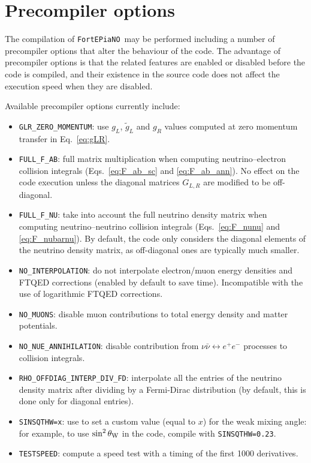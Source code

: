 \documentclass[notitlepage,nofootinbib,showpacs,preprintnumbers,amsmath,amssymb,superscriptaddress,prd,onecolumn]{revtex4-1}
\newcommand{\fortepiano}{\texttt{FortEPiaNO}}
\begin{document}
\section{Precompiler options}
\label{ssec:precompiler}
The compilation of \fortepiano\ may be performed including a number of precompiler options
that alter the behaviour of the code.
The advantage of precompiler options is that the related features are enabled or disabled
before the code is compiled, and their existence in the source code
does not affect the execution speed when they are disabled.

Available precompiler options currently include:
\begin{itemize}
\item \texttt{GLR\_ZERO\_MOMENTUM}: use $g_L$, $\tilde g_L$ and $g_R$ values
computed at zero momentum transfer \cite{Erler:2013xha} in Eq.~\eqref{eq:gLR}.
\item \texttt{FULL\_F\_AB}: full matrix multiplication
when computing neutrino--electron collision integrals
(Eqs.~\eqref{eq:F_ab_sc} and \eqref{eq:F_ab_ann}).
No effect on the code execution unless the diagonal matrices $G_{L,R}$ are modified to be off-diagonal.
\item \texttt{FULL\_F\_NU}: take into account the full neutrino density matrix
when computing neutrino--neutrino collision integrals
(Eqs.~\eqref{eq:F_nunu} and \eqref{eq:F_nubarnu}).
By default, the code only considers the diagonal elements of the neutrino density matrix,
as off-diagonal ones are typically much smaller.
\item \texttt{NO\_INTERPOLATION}: do not interpolate electron/muon energy densities and FTQED corrections
(enabled by default to save time). Incompatible with the use of logarithmic FTQED corrections.
\item \texttt{NO\_MUONS}: disable muon contributions to total energy density and matter potentials.
\item \texttt{NO\_NUE\_ANNIHILATION}: disable contribution from $\nu\bar\nu\leftrightarrow e^+e^-$ processes to collision integrals.
\item \texttt{RHO\_OFFDIAG\_INTERP\_DIV\_FD}: interpolate all the entries of the neutrino density matrix after dividing by a Fermi-Dirac distribution (by default, this is done only for diagonal entries).
\item \texttt{SINSQTHW=x}: use to set a custom value (equal to $x$) for the weak mixing angle: for example, to use $\sin^2\theta_{\rm W}$ in the code, compile with \texttt{SINSQTHW=0.23}.
\item \texttt{TESTSPEED}: compute a speed test with a timing of the first 1000 derivatives.
\end{itemize}
\end{document}
